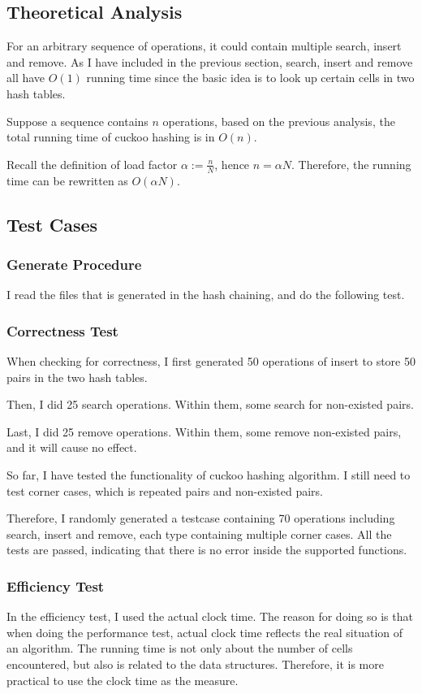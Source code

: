 \documentclass{article}
\begin{document}
\begin{spacing}{1.2}
\subsection{Theoretical Analysis}
For an arbitrary sequence of operations, it could contain multiple search, insert and remove. As I have included in the previous section, search, insert and remove all have $O(1)$ running time since the basic idea is to look up certain cells in two hash tables.

Suppose a sequence contains $n$ operations, based on the previous analysis, the total running time of cuckoo hashing is in $O(n)$.

Recall the definition of load factor $\alpha:=\frac{n}{N}$, hence $n=\alpha N$. Therefore, the running time can be rewritten as $O(\alpha N)$.
\subsection{Test Cases}
\subsubsection{Generate Procedure}
I read the files that is generated in the hash chaining, and do the following test.

\subsubsection{Correctness Test}
When checking for correctness, I first generated 50 operations of insert to store 50 pairs in the two hash tables.

Then, I did 25 search operations. Within them, some search for non-existed pairs.

Last, I did 25 remove operations. Within them, some remove non-existed pairs, and it will cause no effect.

So far, I have tested the functionality of cuckoo hashing algorithm. I still need to test corner cases, which is repeated pairs and non-existed pairs.

Therefore, I randomly generated a testcase containing 70 operations including search, insert and remove, each type containing multiple corner cases. All the tests are passed, indicating that there is no error inside the supported functions.

\subsubsection{Efficiency Test}
In the efficiency test, I used the actual clock time. The reason for doing so is that when doing the performance test, actual clock time reflects the real situation of an algorithm. The running time is not only about the number of cells encountered, but also is related to the data structures. Therefore, it is more practical to use the clock time as the measure.


\end{spacing}
\end{document}
